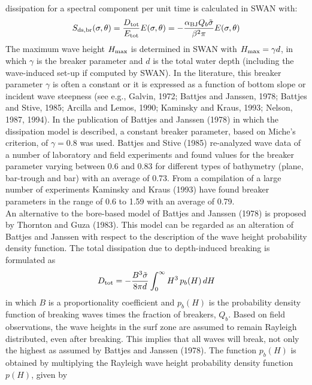 \documentclass[12pt]{book}
\begin{document}
dissipation for a spectral component per unit time is calculated in SWAN with:
\begin{equation}
  S_{\rm ds,br} (\sigma,\theta) = \frac{D_{\rm tot}}{E_{\rm tot}} E(\sigma,\theta) =
  -\frac{\alpha_{\rm BJ} Q_b \tilde{\sigma}}{\beta^2 \pi} E(\sigma,\theta)
  \label{eq3-26}
\end{equation}
The maximum wave height $H_{\rm max}$ is determined in SWAN with $H_{\rm max} = \gamma d$, in which $\gamma$ is the breaker parameter
and $d$ is the total water depth (including the wave-induced set-up if computed by SWAN). In the literature,
this breaker parameter $\gamma$ is often a constant or it is expressed as a function of bottom slope or incident
wave steepness (see e.g., Galvin, 1972; Battjes and Janssen, 1978; Battjes and Stive, 1985; Arcilla and
Lemos, 1990; Kaminsky and Kraus, 1993; Nelson, 1987, 1994).
In the publication of Battjes and Janssen (1978) in which the dissipation model is described, a constant
breaker parameter, based on Miche's criterion, of $\gamma=0.8$ was used. Battjes and Stive (1985) re-analyzed
wave data of a number of laboratory and field experiments and found values for the breaker parameter
varying between 0.6 and 0.83 for different types of bathymetry (plane, bar-trough and bar) with an average
of 0.73. From a compilation of a large number of experiments Kaminsky and Kraus (1993) have found
breaker parameters in the range of 0.6 to 1.59 with an average of 0.79.
\nocite{Arc90L,Kam93K,Nel87,Nel94}
\\[2ex]
\noindent
An alternative to the bore-based model of Battjes and Janssen (1978) is proposed by Thornton and Guza (1983).
This model can be regarded as an alteration of Battjes and Janssen with respect to the description of the wave
height probability density function. The total dissipation due to depth-induced breaking is formulated as
\begin{equation}
  D_{\rm tot} = - \frac{B^3 \tilde{\sigma}}{8 \pi d} \int_{0}^{\infty} H^3 \, p_b(H)\,dH
  \label{eq:tg83}
\end{equation}
in which $B$ is a proportionality coefficient and $p_b(H)$ is the probability density function of breaking
waves times the fraction of breakers, $Q_b$. Based on field observations, the wave heights in the surf zone
are assumed to remain Rayleigh distributed, even after breaking. This implies that all waves will break, not
only the highest as assumed by Battjes and Janssen (1978). The function $p_b(H)$ is obtained by multiplying
the Rayleigh wave height probability density function $p(H)$, given by
\end{document}
